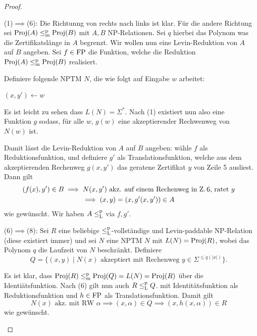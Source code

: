 \begin{proof}
\begin{prooflist}
\item (1)$\implies$(6): Die Richtunng von rechts nach links ist klar. Für die andere Richtung sei $\operatorname{Proj}(A) \leq_\mathrm{m}^\mathrm{p} \operatorname{Proj}(B)$ mit $A,B$ NP-Relationen. Sei $q$ hierbei das Polynom was die Zertifikatslänge in $A$ begrenzt.
    Wir wollen nun eine Levin-Reduktion von $A$ auf $B$ angeben. Sei $f\in \mathrm{FP}$ die Funktion, welche die Reduktion $\operatorname{Proj}(A) \leq_\mathrm{m}^\mathrm{p} \operatorname{Proj}(B)$ realisiert.

    Definiere folgende NPTM $N$, die wie folgt auf Eingabe $w$ arbeitet: \\
    \begin{algorithm}[H]
        $(x, y')\gets w$\;
    \end{algorithm}
    Es ist leicht zu sehen dass $L(N)=\Sigma^*$. Nach (1) existiert nun also eine Funktion $g$ sodass, für alle $w$, $g(w)$ eine akzeptierender Rechwenweg von $N(w)$ ist.

    Damit lässt die Levin-Reduktion von $A$ auf $B$ angeben: wähle $f$ als Reduktionsfunktion, und definiere $g'$ als Translationsfunktion, welche aus dem akzeptierenden Rechenweg $g(x, y')$ das geratene Zertifikat $y$ von Zeile 5 ausliest. Dann gilt
    \begin{gather*}
        (f(x), y') \in B \implies N(x, y') \text{ akz. auf einem Rechenweg in Z.\,6, ratet $y$}\\
        \implies (x,y)=(x, g'(x, y'))\in A
    \end{gather*}
    wie gewünscht. Wir haben $A\leq_\mathrm{L}^\mathrm{p}$ via $f, g'$.
\item (6)$\implies$(8): Sei $R$ eine beliebige $\leq_\mathrm{L}^\mathrm{p}$-vollständige und Levin-paddable NP-Relation (diese existiert immer) und sei $N$ eine NPTM $N$ mit $L(N)=\operatorname{Proj}(R)$, wobei das Polynom $q$ die Laufzeit von $N$ beschränkt.  Definiere
    \[ Q = \{ (x, y) \mid \text{$N(x)$ akzeptiert mit Rechenweg $y\in\Sigma^{\leq q(|x|)}$} \}. \]

    Es ist klar, dass $\operatorname{Proj}(R)\leq_\mathrm{m}^\mathrm{p} \operatorname{Proj}(Q)=L(N)=\operatorname{Proj}(R)$ über die Identiätsfunktion.
    Nach (6) gilt nun auch $R\leq_\mathrm{L}^\mathrm{p} Q$. mit Identitätsfunktion als Reduktionsfunktion und $h\in \mathrm{FP}$ als Translationsfunktion.
    Damit gilt
    \[ \text{$N(x)$ akz. mit RW $\alpha$} \implies (x, \alpha)\in Q \implies (x, h(x, \alpha))\in R \]
    wie gewünscht.



\end{prooflist}
\end{proof}
